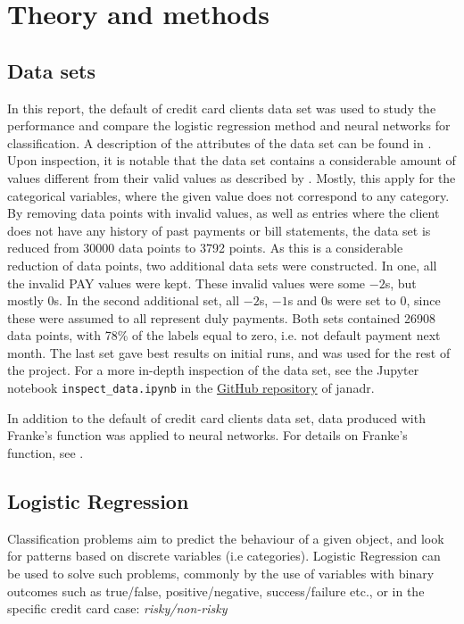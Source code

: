 \section{Theory and methods}
\label{sec:theory}

\subsection{Data sets}
\label{sec:datasets}
In this report, the default of credit card clients data set \citep{yeh2009UCI} was used to study the performance and compare the logistic regression method and neural networks for classification. A description of the attributes of the data set can be found in \cite{yeh2009UCI}. Upon inspection, it is notable that the data set contains a considerable amount of values different from their valid values as described by \citeauthor{yeh2009UCI}. Mostly, this apply for the categorical variables, where the given value does not correspond to any category. By removing data points with invalid values, as well as entries where the client does not have any history of past payments or bill statements, the data set is reduced from 30000 data points to 3792 points. As this is a considerable reduction of data points, two additional data sets were constructed. In one, all the invalid PAY values were kept. These invalid values were some $-2$s, but mostly $0$s. In the second additional set, all $-2$s, $-1$s and $0$s were set to $0$, since these were assumed to all represent duly payments. Both sets contained 26908 data points, with 78\% of the labels equal to zero, i.e. not default payment next month. The last set gave best results on initial runs, and was used for the rest of the project. For a more in-depth inspection of the data set, see the Jupyter notebook \texttt{inspect\_data.ipynb} in the \href{https://github.com/janadr/FYS-STK4155/tree/master/project2}{GitHub repository} of janadr.

In addition to the default of credit card clients data set, data produced with Franke's function was applied to neural networks. For details on Franke's function, see \cite{prosjekt1}.

\subsection{Logistic Regression}
Classification problems aim to predict the behaviour of a given object, and look for patterns based on discrete variables (i.e categories). Logistic Regression can be used to solve such problems, commonly by the use of variables with binary outcomes such as true/false, positive/negative, success/failure etc., or in the specific credit card case: \textit{risky/non-risky} \cite{LogRegLectures}

